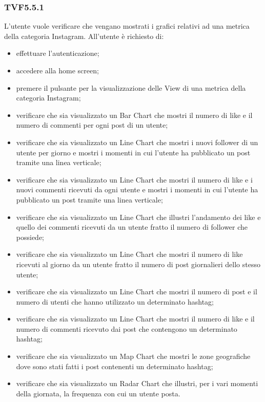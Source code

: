 		\subsubsection{TVF5.5.1}
			L'utente vuole verificare che vengano mostrati i grafici relativi ad una metrica della categoria Instagram. All'utente è richiesto di:
			\begin{itemize}
				\item effettuare l'autenticazione;
				\item accedere alla home screen;
				\item premere il pulsante per la visualizzazione delle View di una metrica della categoria Instagram;
				\item verificare che sia visualizzato un Bar Chart che mostri il numero di like e il numero di commenti per ogni post di un utente;
				\item verificare che sia visualizzato un Line Chart che mostri i nuovi follower di un utente per giorno e mostri i momenti in cui l'utente ha pubblicato un post tramite una linea verticale;
				\item verificare che sia visualizzato un Line Chart che mostri il numero di like e i nuovi commenti ricevuti da ogni utente e mostri i momenti in cui l'utente ha pubblicato un post tramite una linea verticale;
				\item verificare che sia visualizzato un Line Chart che illustri l'andamento dei like e quello dei commenti ricevuti da un utente fratto il numero di follower che possiede;
				\item verificare che sia visualizzato un Line Chart che mostri il numero di like ricevuti al giorno da un utente fratto il numero di post giornalieri dello stesso utente;
				\item verificare che sia visualizzato un Line Chart che mostri il numero di post e il numero di utenti che hanno utilizzato un determinato hashtag;
				\item verificare che sia visualizzato un Line Chart che mostri il numero di like e il numero di commenti ricevuto dai post che contengono un determinato hashtag;
				\item verificare che sia visualizzato un Map Chart che mostri le zone geografiche dove sono stati fatti i post contenenti un determinato hashtag;
				\item verificare che sia visualizzato un Radar Chart che illustri, per i vari momenti della giornata, la frequenza con cui un utente posta.
			\end{itemize}
			
